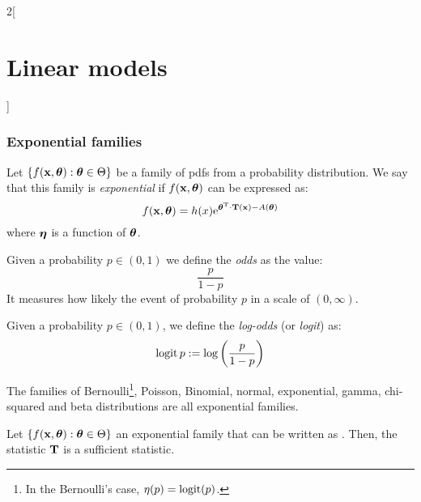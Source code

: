 \documentclass[../../../main_math.tex]{subfiles}
\begin{document}
\begin{multicols}{2}[\section{Linear models}]
  \subsubsection{Exponential families}
  \begin{definition}
    Let $\{f(\boldsymbol{\mathrm{x}},\boldsymbol{\mathrm{\theta}}):\boldsymbol{\mathrm{\theta}}\in\Theta\}$ be a family of pdfs from a probability distribution. We say that this family is \emph{exponential} if $f(\boldsymbol{\mathrm{x}},\boldsymbol{\mathrm{\theta}})$ can be expressed as:
    \begin{equation}\label{LM:expofamily}
      f(\boldsymbol{\mathrm{x}},\boldsymbol{\mathrm{\theta}})=h(x)\mathrm{e}^{{\boldsymbol{\mathrm{\theta}}}^{\mathrm{T}}\cdot \boldsymbol{\mathrm{T}}(\boldsymbol{\mathrm{x}})-A(\boldsymbol{\mathrm{\theta}})}
    \end{equation}
    where $\boldsymbol{\mathrm{\eta}}$ is a function of $\boldsymbol{\mathrm{\theta}}$.
  \end{definition}
  \begin{definition}
    Given a probability $p\in(0,1)$ we define the \emph{odds} as the value: $$\frac{p}{1-p}$$ It measures how likely the event of probability $p$ in a scale of $(0,\infty)$.
  \end{definition}
  \begin{definition}
    Given a probability $p\in(0,1)$, we define the \emph{log-odds} (or \emph{logit}) as: $$\operatorname{logit} p:=\log\left(\frac{p}{1-p}\right)$$
  \end{definition}
  \begin{proposition}
    The families of Bernoulli\footnote{In the Bernoulli's case, $\eta(p)=\operatorname{logit}(p)$.}, Poisson, Binomial, normal, exponential, gamma, chi-squared and beta distributions are all exponential families.
  \end{proposition}
  \begin{theorem}
    Let $\{f(\boldsymbol{\mathrm{x}},\boldsymbol{\mathrm{\theta}}):\boldsymbol{\mathrm{\theta}}\in\Theta\}$  an exponential family that can be written as . Then, the statistic $\boldsymbol{\mathrm{T}}$ is a sufficient statistic.
  \end{theorem}
\end{multicols}
\end{document}
